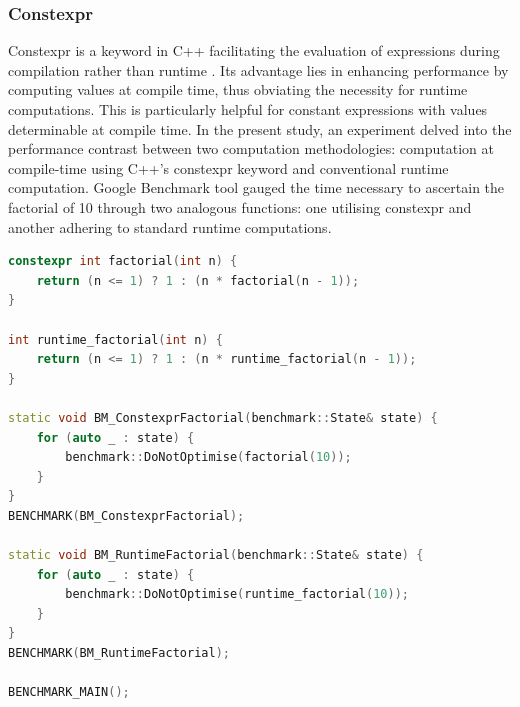 \documentclass{article}
\theoremstyle{break}
\begin{document}
\subsubsection*{Constexpr}
Constexpr is a keyword in C++ facilitating the evaluation of expressions during compilation rather than runtime \cite{14}. Its advantage lies in enhancing performance by computing values at compile time, thus obviating the necessity for runtime computations. This is particularly helpful for constant expressions with values determinable at compile time. In the present study, an experiment delved into the performance contrast between two computation methodologies: computation at compile-time using C++'s constexpr keyword and conventional runtime computation. Google Benchmark tool gauged the time necessary to ascertain the factorial of 10 through two analogous functions: one utilising constexpr and another adhering to standard runtime computations.

\begin{lstlisting}[style=customc++, language=C++, caption={Constexpr Google Benchmark}]
constexpr int factorial(int n) {
	return (n <= 1) ? 1 : (n * factorial(n - 1));
}

int runtime_factorial(int n) {
	return (n <= 1) ? 1 : (n * runtime_factorial(n - 1));
}

static void BM_ConstexprFactorial(benchmark::State& state) {
	for (auto _ : state) {
    	benchmark::DoNotOptimise(factorial(10));
	}
}
BENCHMARK(BM_ConstexprFactorial);

static void BM_RuntimeFactorial(benchmark::State& state) {
	for (auto _ : state) {
    	benchmark::DoNotOptimise(runtime_factorial(10));
	}
}
BENCHMARK(BM_RuntimeFactorial);

BENCHMARK_MAIN();

\end{lstlisting}
\end{document}
